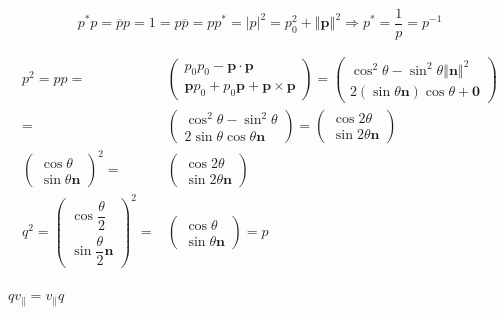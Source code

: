 \documentclass[
]{book}
\theoremstyle{definition}
\theoremstyle{definition}
\theoremstyle{definition}
\theoremstyle{definition}
\theoremstyle{remark}
\begin{document}
\[
p^{*}p=\overline{p}p=1=p\overline{p}=pp^{*}=\left|p\right|^{2}=p_{{\scriptscriptstyle 0}}^{2}+\left\Vert \boldsymbol{p}\right\Vert ^{2}\Rightarrow p^{*}=\dfrac{1}{p}=p^{-1}
\]

\[
\begin{aligned}
p^{2}=pp= & \begin{pmatrix}p_{{\scriptscriptstyle 0}}p_{{\scriptscriptstyle 0}}-\boldsymbol{p}\cdot\boldsymbol{p}\\
\boldsymbol{p}p_{{\scriptscriptstyle 0}}+p_{{\scriptscriptstyle 0}}\boldsymbol{p}+\boldsymbol{p}\times\boldsymbol{p}
\end{pmatrix}=\begin{pmatrix}\cos^{2}\theta-\sin^{2}\theta\left\Vert \boldsymbol{n}\right\Vert ^{2}\\
2\left(\sin\theta\boldsymbol{n}\right)\cos\theta+\boldsymbol{0}
\end{pmatrix}\\
= & \begin{pmatrix}\cos^{2}\theta-\sin^{2}\theta\\
2\sin\theta\cos\theta\boldsymbol{n}
\end{pmatrix}=\begin{pmatrix}\cos2\theta\\
\sin2\theta\boldsymbol{n}
\end{pmatrix}\\
\begin{pmatrix}\cos\theta\\
\sin\theta\boldsymbol{n}
\end{pmatrix}^{2}= & \begin{pmatrix}\cos2\theta\\
\sin2\theta\boldsymbol{n}
\end{pmatrix}\\
q^{2}=\begin{pmatrix}\cos\dfrac{\theta}{2}\\
\sin\dfrac{\theta}{2}\boldsymbol{n}
\end{pmatrix}^{2}= & \begin{pmatrix}\cos\theta\\
\sin\theta\boldsymbol{n}
\end{pmatrix}=p
\end{aligned}
\]

\(qv_{{\scriptscriptstyle \parallel}}=v_{{\scriptscriptstyle \parallel}}q\)
\end{document}
